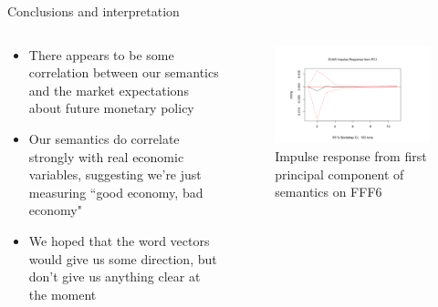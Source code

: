 \documentclass[9pt]{beamer}
\begin{document}
	\begin{frame}{Conclusions and interpretation}
		\begin{columns}
			\begin{column}{0.48\textwidth}
				\begin{itemize}
					\item There appears to be some correlation between our semantics and the market expectations about future monetary policy
					\item Our semantics do correlate strongly with real economic variables, suggesting we're just measuring ``good economy, bad economy"
					\item We hoped that the word vectors would give us some direction, but don't give us anything clear at the moment
				\end{itemize}
			\end{column}
			\begin{column}{0.5\textwidth}
				\begin{figure}
					\includegraphics[width=\textwidth]{augmentedimpulse.png}
					\caption{Impulse response from first principal component of semantics on FFF6}
				\end{figure}
			\end{column}
		\end{columns}
	\end{frame}
\end{document}
